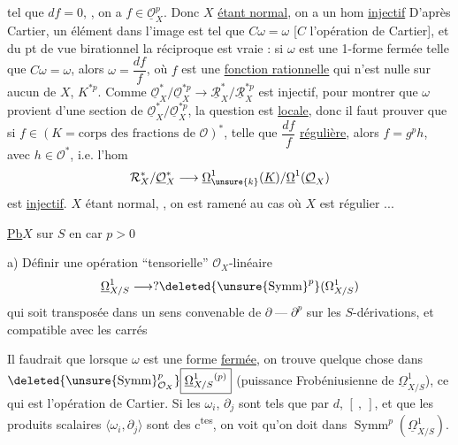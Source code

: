 tel que $df=0$, , on a
$f\in\underline{\mathcal O}_X^p$.
Donc $X$ \uline{étant normal}, on a un hom \uline{injectif}
D'après Cartier, un élément dans l'image est tel que
$C\omega=\omega$ [$C$ l'opération de Cartier], et du pt de
vue birationnel la réciproque est vraie : si $\omega$ est une
1-forme fermée telle que $C\omega=\omega$, alors $\omega=\dfrac{df}{f}$,
où $f$ est une \uline{fonction rationnelle} qui n'est nulle
sur aucun  de $X$,
 $K^{*p}$.
Comme $\underline{\mathcal O}_X^*/\underline{\mathcal O}_X^{*p}\longrightarrow
\underline{\mathcal R}_X^*/\underline{\mathcal R}_X^{*p}$ est injectif,
pour montrer que $\omega$ provient d'une section de
$\underline{\mathcal O}_X^*/\underline{\mathcal O}_X^{*p}$, la question est \uline{locale},
donc il faut prouver que si $f\in(K=\text{corps des fractions de }\mathcal O)^*$,
telle que $\dfrac{df}{f}$ \uline{régulière}, alors $f=g^p h$, avec $h\in\mathcal O^*$,
i.e.  l'hom
\[
\mathcal R_X^*/\underline{\mathcal O}_X^*\longrightarrow
\underline\Omega^1_{\unsure{k}}(\underline K)/\underline\Omega^1(\underline{\mathcal O}_X)
\]
est \uline{injectif}. $X$ étant normal, ,
on est ramené au cas où $X$ est  régulier ...

\uline{Pb}\qquad $X$ sur $S$ en car $p>0$

a) Définir une opération ``tensorielle''
$\mathcal O_X$-linéaire
\[
\underline\Omega^1_{X/S}\longrightarrow
?\deleted{\unsure{\operatorname{Symm}}^p}(\Omega^1_{X/S})
\]
qui soit transposée dans un sens convenable
de \deleted{$\unsure{\partial}$} $\partial\mathbin{\text{---}}\partial^p$
sur les $S$-dérivations, et compatible avec les carrés

Il faudrait que lorsque $\omega$ est une forme \uline{fermée},
on trouve quelque chose dans
$\deleted{\unsure{\operatorname{Symm}}^p_{\mathcal O_X}}\boxed{\underline\Omega^1_{X/S}{}^{(p)}}$
(puissance Frobéniusienne de $\underline\Omega^1_{X/S}$),
ce qui est l'opération de Cartier.
Si les $\omega_i$, $\partial_j$ sont tels que
 par $d$, $[\ ,\ ]$, et que
les produits scalaires $\langle\omega_i,\partial_j\rangle$ sont des c\textsuperscript{tes},
on voit qu'on doit  dans
$\boxed{\operatorname{Symm}^p(\underline\Omega^1_{X/S})}$.

